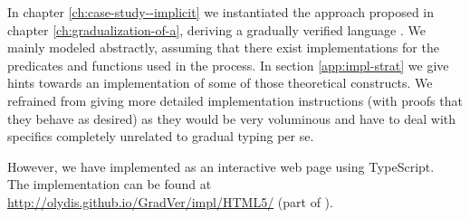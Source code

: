 In chapter \ref{ch:case-study--implicit} we instantiated the approach proposed in chapter \ref{ch:gradualization-of-a}, deriving a gradually verified language \gvlidf.
We mainly modeled \gvlidf abstractly, assuming that there exist implementations for the predicates and functions used in the process.
In section \ref{app:impl-strat} we give hints towards an implementation of some of those theoretical constructs.
We refrained from giving more detailed implementation instructions (with proofs that they behave as desired) as they would be very voluminous and have to deal with specifics completely unrelated to gradual typing per se.

However, we have implemented \gvlidf as an interactive web page using TypeScript.\\
The implementation can be found at \url{http://olydis.github.io/GradVer/impl/HTML5/} (part of \cite{olydisGitHub}).

